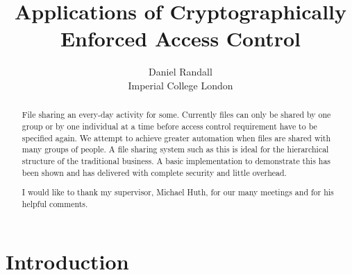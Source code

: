 \documentclass[12pt, titlepage]{article}
\title{Applications of Cryptographically Enforced Access Control}
\author{Daniel Randall \\ Imperial College London}
\date{}
\begin{document}
\maketitle

\begin{abstract}
File sharing an every-day activity for some. Currently files can only be shared by one group or by one individual at a time before access control requirement have to be specified again. We attempt to achieve greater automation when files are shared with many groups of people. A file sharing system such as this is ideal for the hierarchical structure of the traditional business. A basic implementation to demonstrate this has been shown and has delivered with complete security and little overhead.
\end{abstract}

\renewcommand{\abstractname}{Acknowledgements}
\begin{abstract}
I would like to thank my supervisor, Michael Huth, for our many meetings and for his helpful comments.
\end{abstract}


\newpage
\tableofcontents
\newpage

\newcommand{\defeq}{\stackrel{\textup{\tiny def}}{=}}

\section{Introduction}
\end{document}
